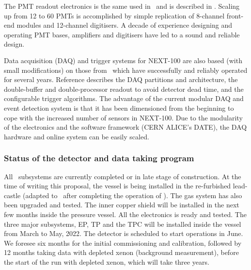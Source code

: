 \indent

The PMT readout electronics is the same  used in \NEW\ and is described in \cite{Alvarez:2019a}. Scaling up from 12 to 60 PMTs is accomplished by simple replication of 8-channel front-end modules and 12-channel digitisers. A decade of experience designing and operating PMT bases, amplifiers and digitisers have led to a sound and reliable design. %

\indent

Data acquisition (DAQ) and trigger systems for NEXT-100 are also based (with small modifications) on those from \NEW\, which have successfully and reliably operated for several years. Reference \cite{Esteve:2021a} describes the DAQ partitions and architecture, the double-buffer and double-processor readout to avoid detector dead time, and the configurable trigger algorithms. The advantage of the current modular DAQ and event detection system is that it has been dimensioned from the beginning to cope with the increased number of sensors in NEXT-100. Due to the modularity of the electronics and the software framework (CERN ALICE's DATE), the DAQ hardware and online system can be easily scaled.

\subsubsection{Status of the detector and data taking program}

All \Next\ subsystems are currently completed or in late stage of construction. At the time of writing this proposal, the vessel is being installed in the re-furbished lead-castle (adapted to \Next\ after completing the operation of \NEW). The gas system has also been upgraded and tested. The inner copper shield will be installed in the next few months inside the pressure vessel. All the electronics is ready and tested. The three major subsystems, EP, TP and the TPC will be installed inside the vessel from March to May, 2022. The detector is scheduled to start operations in June. We foresee six months for the initial commissioning and calibration, followed by 12 months taking data with depleted xenon (background measurement), before the start of the run with depleted xenon, which will take three years. 

